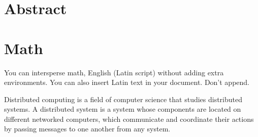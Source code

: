 \documentclass{article}
\begin{document}
\section{Abstract}
 
\section{Math}
You can intersperse math, English (Latin script) without adding extra environments. You can also insert Latin text in your document. Don't append.

Distributed computing is a field of computer science that studies distributed systems. A distributed system is a system whose components are located on different networked computers, which communicate and coordinate their actions by passing messages to one another from any system.

 
\end{document}
